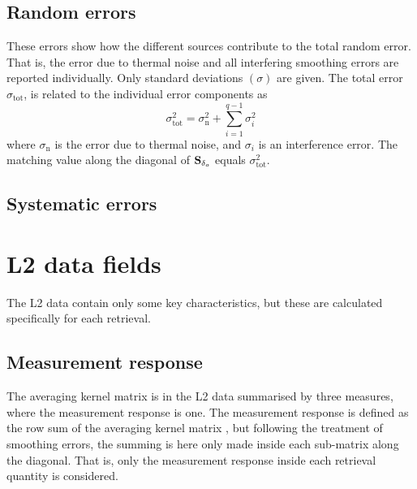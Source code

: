 \subsection{Random errors}
\label{sec:erand}
%
These errors show how the different sources contribute to the total random
error. That is, the error due to thermal noise and all interfering smoothing
errors are reported individually. Only standard deviations $(\sigma)$ are
given. The total error $\sigma_\mathrm{tot}$, is related to the individual
error components as
\begin{equation}
  \label{eq:randerr:sigma}
  \sigma_\mathrm{tot}^2 = \sigma_\mathrm{n}^2 + \sum_{i=1}^{q-1} \sigma_{i}^2
\end{equation}
where $\sigma_\mathrm{n}$ is the error due to thermal noise, and $\sigma_{i}$
is an interference error. The matching value along the diagonal of
$\mathbf{S}_{\delta_o}$ equals $\sigma_\mathrm{tot}^2$.


\subsection{Systematic errors}
\label{sec:esyst}
%



\section{L2 data fields}
%
The L2 data contain only some key characteristics, but these are calculated
specifically for each retrieval.
\\

\subsection{Measurement response}
\label{sec:mresp}
%
The averaging kernel matrix is in the L2 data summarised by three measures,
where the measurement response is one. The measurement response is defined as
the row sum of the averaging kernel matrix \citep{baron:studi:02}, but
following the treatment of smoothing errors, the summing is here only made
inside each sub-matrix along the diagonal. That is, only the measurement
response inside each retrieval quantity is considered.


